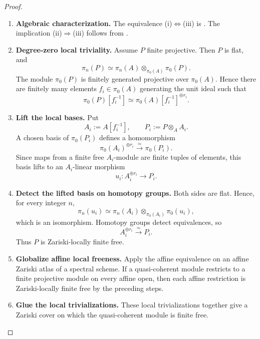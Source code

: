 \begin{proof}
\leavevmode
\begin{enumerate}[label=\textup{(\arabic*)}]
    \item \textbf{Algebraic characterization.}
    The equivalence \textup{(i)}\(\Leftrightarrow\)\textup{(iii)} is
    . The implication
    \textup{(ii)}\(\Rightarrow\)\textup{(iii)} follows from
    .

    \item \textbf{Degree-zero local triviality.}
    Assume \(P\) finite projective. Then \(P\) is flat, and
    \[
        \pi_n(P)
        \simeq
        \pi_n(A)\otimes_{\pi_0(A)}\pi_0(P).
    \]
    The module \(\pi_0(P)\) is finitely generated projective over
    \(\pi_0(A)\). Hence there are finitely many elements
    \(f_i\in\pi_0(A)\) generating the unit ideal such that
    \[
        \pi_0(P)[f_i^{-1}]
        \simeq
        \pi_0(A)[f_i^{-1}]^{\oplus r_i}.
    \]

    \item \textbf{Lift the local bases.}
    Put
    \[
        A_i:=A[f_i^{-1}],
        \qquad
        P_i:=P\otimes_AA_i.
    \]
    A chosen basis of \(\pi_0(P_i)\) defines a homomorphism
    \[
        \pi_0(A_i)^{\oplus r_i}
        \xrightarrow{\simeq}
        \pi_0(P_i).
    \]
    Since maps from a finite free \(A_i\)-module are finite tuples of
    elements, this basis lifts to an \(A_i\)-linear morphism
    \[
        u_i:A_i^{\oplus r_i}\longrightarrow P_i.
    \]

    \item \textbf{Detect the lifted basis on homotopy groups.}
    Both sides are flat. Hence, for every integer \(n\),
    \[
        \pi_n(u_i)
        \simeq
        \pi_n(A_i)\otimes_{\pi_0(A_i)}\pi_0(u_i),
    \]
    which is an isomorphism. Homotopy groups detect equivalences, so
    \[
        A_i^{\oplus r_i}\xrightarrow{\simeq}P_i.
    \]
    Thus \(P\) is Zariski-locally finite free.

    \item \textbf{Globalize affine local freeness.}
    Apply the affine equivalence on an affine Zariski atlas of a spectral
    scheme. If a quasi-coherent module restricts to a finite projective
    module on every affine open, then each affine restriction is
    Zariski-locally finite free by the preceding steps.

    \item \textbf{Glue the local trivializations.}
    These local
    trivializations together give a Zariski cover on which the
    quasi-coherent module is finite free.


\end{enumerate}
\end{proof}
